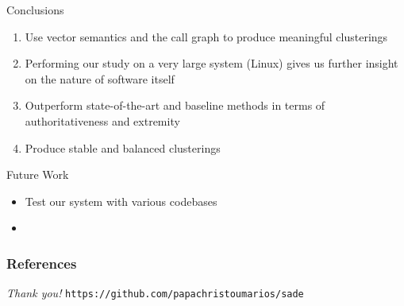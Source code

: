 \documentclass{beamer}
\begin{document}
\begin{frame}{Conclusions}

\begin{enumerate}
    \item Use vector semantics and the call graph to produce meaningful clusterings
    \item Performing our study on a very large system (Linux) gives us further insight on the nature of software itself
    \item Outperform state-of-the-art and baseline methods in terms of authoritativeness and extremity
    \item Produce stable and balanced clusterings 
\end{enumerate}
    
\end{frame}

\begin{frame}{Future Work}

\begin{itemize}
    \item Test our system with various codebases
    \item 
\end{itemize}
    
\end{frame}


\begin{frame}[allowframebreaks]
\frametitle{References}


\end{frame}
 

\begin{frame}{}
  \centering \Large {
  \emph{Thank you!}}
  \texttt{https://github.com/papachristoumarios/sade}
\end{frame}
 
 
\end{document}
